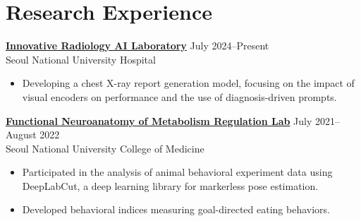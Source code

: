 \documentclass[10pt, a4paper]{article}
\newenvironment{customitemize}
	{\begin{itemize}[leftmargin=*, noitemsep, topsep=0pt, label=$\cdot$]}
	{\end{itemize}}
\begin{document}
\section*{Research Experience}
\textbf{\href{http://irail.snu.ac.kr}{Innovative Radiology AI Laboratory}} \hfill July 2024--Present\\
Seoul National University Hospital \smallskip
\begin{customitemize}
    \item Developing a chest X-ray report generation model, focusing on the impact of visual encoders on performance and the use of diagnosis-driven prompts.
\end{customitemize}
\bigskip
\textbf{\href{https://fnmr.snu.ac.kr/}{Functional Neuroanatomy of Metabolism Regulation Lab}} \hfill July 2021--August 2022\\
Seoul National University College of Medicine \smallskip
\begin{customitemize}
    \item Participated in the analysis of animal behavioral experiment data using DeepLabCut, a deep learning library for markerless pose estimation.
    \item Developed behavioral indices measuring goal-directed eating behaviors.
\end{customitemize}

\end{document}
